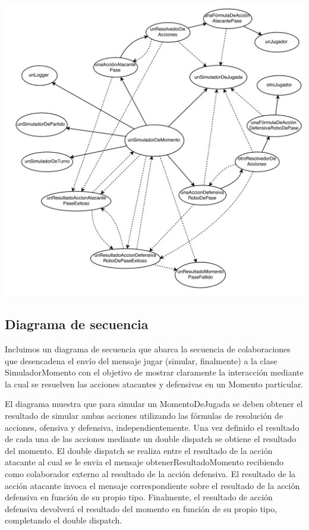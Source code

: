 \begin{center}
\includegraphics[width=15cm]{diagramas/DO8}
\end{center}

\subsection{Diagrama de secuencia}
Incluimos un diagrama de secuencia que abarca la secuencia de colaboraciones que desencadena el envío
del mensaje jugar (simular, finalmente) a la clase SimuladorMomento con el objetivo de mostrar claramente
la interacción mediante la cual se resuelven las acciones atacantes y defensivas en un Momento particular.

El diagrama muestra que para simular un MomentoDeJugada se deben obtener el resultado de simular ambas acciones
utilizando las fórmulas de resolución de acciones, ofensiva y defensiva, independientemente. Una vez definido el resultado de
cada una de las acciones mediante un double dispatch se obtiene el resultado del momento. El double dispatch se realiza entre
el resultado de la acción atacante al cual se le envia el mensaje obtenerResultadoMomento recibiendo como colaborador externo
al resultado de la acción defensiva. El resultado de la acción atacante invoca el mensaje correspondiente sobre el resultado de
la acción defensiva en función de su propio tipo. Finalmente, el resultado de acción defensiva devolverá el resultado del momento
en función de su propio tipo, completando el double dispatch.

